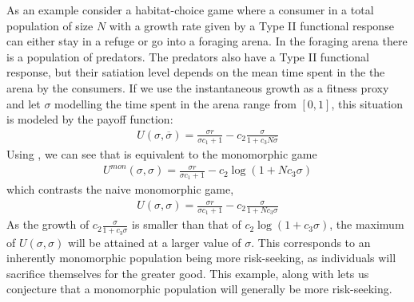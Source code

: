 As an example consider a habitat-choice game where a consumer in a total population of size $N$ with a growth rate given by a Type II functional response can either stay in a refuge or go into a foraging arena. In the foraging arena there is a population of predators. The predators also have a Type II functional response, but their satiation level depends on the mean time spent in the the arena by the consumers. If we use the instantaneous growth as a fitness proxy and let $\sigma$ modelling the time spent in the arena range from $[0,1]$, this situation is modeled by the payoff function:
\begin{align}
  U(\sigma,\overbar{\sigma}) = \frac{\sigma r}{\sigma c_1 + 1} - c_2\frac{\sigma}{1 + c_3 N \overbar{\sigma}}
  \label{eq:simple_mfg}
\end{align}
Using , we can see that  is equivalent to the monomorphic game
\begin{align}
  U^{mon}(\sigma,\sigma) = \frac{\sigma r}{\sigma c_1 + 1} - c_2\log(1+N c_3\sigma)
\end{align}
which contrasts the naive monomorphic game,
\begin{align}
  U(\sigma,\sigma) = \frac{\sigma r}{\sigma c_1 + 1} - c_2\frac{\sigma}{1 + N c_3\sigma}
\end{align}
As the growth of $c_2\frac{\sigma}{1 + c_3\sigma}$ is smaller than that of $c_2\log(1+c_3 \sigma)$, the maximum of $U(\sigma,\sigma)$ will be attained at a larger value of $\sigma$. This corresponds to an inherently monomorphic population being more risk-seeking, as individuals will sacrifice themselves for the greater good. This example, along with  lets us conjecture that a monomorphic population will generally be more risk-seeking.


